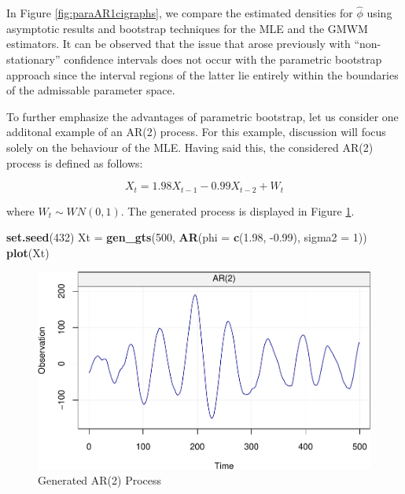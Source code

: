 \documentclass[]{book}
\newenvironment{Shaded}{\begin{snugshade}}{\end{snugshade}}
\newcommand{\DataTypeTok}[1]{\textcolor[rgb]{0.13,0.29,0.53}{#1}}
\newcommand{\DecValTok}[1]{\textcolor[rgb]{0.00,0.00,0.81}{#1}}
\newcommand{\FloatTok}[1]{\textcolor[rgb]{0.00,0.00,0.81}{#1}}
\newcommand{\KeywordTok}[1]{\textcolor[rgb]{0.13,0.29,0.53}{\textbf{#1}}}
\newcommand{\NormalTok}[1]{#1}
\newcommand{\StringTok}[1]{\textcolor[rgb]{0.31,0.60,0.02}{#1}}
\theoremstyle{definition}
\theoremstyle{definition}
\theoremstyle{definition}
\theoremstyle{remark}
\begin{document}
In Figure \ref{fig:paraAR1cigraphs}, we compare the estimated densities
for \(\hat{\phi}\) using asymptotic results and bootstrap techniques for
the MLE and the GMWM estimators. It can be observed that the issue that
arose previously with ``non-stationary'' confidence intervals does not
occur with the parametric bootstrap approach since the interval regions
of the latter lie entirely within the boundaries of the admissable
parameter space.

To further emphasize the advantages of parametric bootstrap, let us
consider one additonal example of an AR(2) process. For this example,
discussion will focus solely on the behaviour of the MLE. Having said
this, the considered AR(2) process is defined as follows:

\begin{equation}
{X_t} = {1.98}{X_{t - 1}} - {0.99}{X_{t - 2}} + {W_t}
\label{eq:ciar2}
  \end{equation}

where \(W_t \sim WN(0, 1)\). The generated process is displayed in
Figure \ref{fig:CIAR2data}.

\begin{Shaded}
\begin{Highlighting}[]
\KeywordTok{set.seed}\NormalTok{(}\DecValTok{432}\NormalTok{)}
\NormalTok{Xt =}\StringTok{ }\KeywordTok{gen_gts}\NormalTok{(}\DecValTok{500}\NormalTok{, }\KeywordTok{AR}\NormalTok{(}\DataTypeTok{phi =} \KeywordTok{c}\NormalTok{(}\FloatTok{1.98}\NormalTok{, }\FloatTok{-0.99}\NormalTok{), }\DataTypeTok{sigma2 =} \DecValTok{1}\NormalTok{))}
\KeywordTok{plot}\NormalTok{(Xt)}
\end{Highlighting}
\end{Shaded}

\begin{figure}
\centering
\includegraphics{ts_files/figure-latex/CIAR2data-1.pdf}
\caption{\label{fig:CIAR2data}Generated AR(2) Process}
\end{figure}
\end{document}
